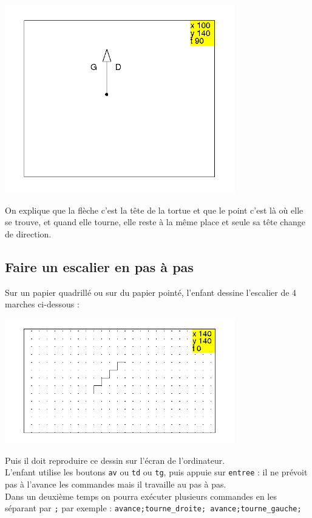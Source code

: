 \documentclass[a4paper,11pt]{book}
\begin{document}
%
\begin{center}\includegraphics[width=10cm]{tortuef}\end{center}

On explique que la fl\`eche c'est la t\^ete de la tortue et que le point c'est 
l\`a o\`u elle se trouve, et quand elle tourne, elle reste \`a la m\^eme place 
et seule sa t\^ete change de direction.  
\subsection{Faire un escalier en pas \`a pas}
Sur un papier quadrill\'e ou sur du papier point\'e, l'enfant dessine 
l'escalier de 4 marches ci-dessous :

%
\begin{center}\includegraphics[width=10cm]{tortuee}\end{center}

Puis il doit reproduire ce dessin sur l'\'ecran de l'ordinateur.\\
L'enfant utilise les boutons {\tt av} ou {\tt td} ou {\tt tg}, puis appuie 
sur {\tt entree} : il ne pr\'evoit pas \`a l'avance les commandes mais il 
travaille au pas \`a pas.\\
Dans un deuxi\`eme temps on pourra ex\'ecuter plusieurs commandes en 
les s\'eparant par {\tt ;} par exemple :
{\tt avance;tourne\_droite; avance;tourne\_gauche;}
\end{document}
